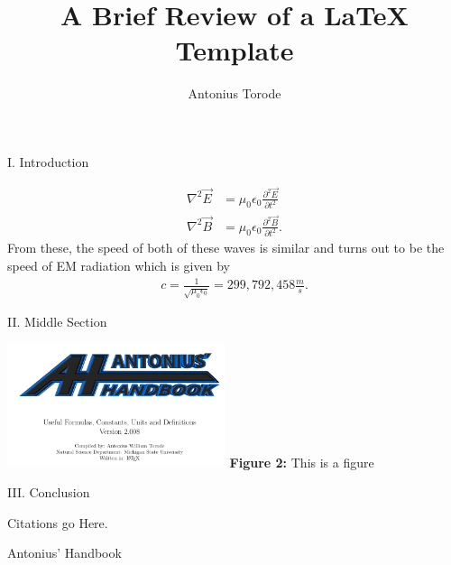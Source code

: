 \documentclass[11pt]{article}
\title{A Brief Review of a LaTeX Template}
\author{Antonius Torode}
\begin{document}
\maketitle
\thispagestyle{fancy}

\begin{abstract}
	\lipsum[1]
\end{abstract}

\begin{multicols}{2}
	\begin{center}
		I. Introduction
	\end{center}
\lipsum[2]
\begin{align}
\nabla^2 \vec{E} &= \mu_0\epsilon_0 \frac{\partial^2 \vec{E}}{\partial t^2} \\
\nabla^2 \vec{B} &= \mu_0\epsilon_0 \frac{\partial^2 \vec{B}}{\partial t^2}.
\end{align}
From these, the speed of both of these waves is similar and turns out to be the speed of EM radiation \cite{label1} which is given by
\begin{align}
c=\frac{1}{\sqrt{\mu_0\epsilon_0}} = 299,792,458 \frac{m}{s}.
\end{align}
\lipsum[3]
\begin{center}
	II. Middle Section
\end{center}

\lipsum[4]

\begin{center}
	\centering
	\includegraphics[width=0.48\textwidth]{./image1.png}
	{\footnotesize\textbf{Figure 2:} This is a figure \cite{AH}} 
\end{center}



\begin{center}
	III. Conclusion
\end{center}

\lipsum[5]



\begin{thebibliography}{9}
	{\footnotesize
	 Citations go Here.	
		
	 Antonius' Handbook 
	}
\end{thebibliography}
\end{multicols}

\end{document}
